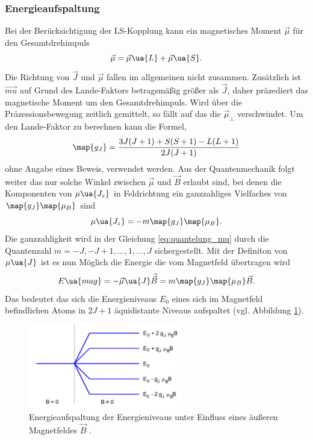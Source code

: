 \subsubsection{Energieaufspaltung}
Bei der Berücksichtigung der LS-Kopplung kann ein magnetisches Moment $\vec{\mu}$ für den Gesamtdrehimpuls
\begin{equation*}
  \vec{\mu}=\vec{\mu}\ua{L} + \vec{\mu}\ua{S}.
\end{equation*}
Die Richtung von $\vec{J}$ und $\vec{\mu}$ fallen im allgemeinen nicht zusammen. Zusätzlich ist
$\vec{mu}$ auf Grund des Lande-Faktors betragsmäßig größer als $\vec{J}$, daher präzediert das magnetische Moment um den Gesamtdrehimpuls.
Wird über die Präzessionsbewegung zeitlich gemittelt, so fällt auf das die $\vec{\mu}_{\perp}$ verschwindet.
Um den Lande-Faktor zu berechnen kann die Formel,
\begin{equation}
  \label{eq:lande_faktor}
  \map{g_J}=\frac{3J(J+1)+S(S+1)-L(L+1)}{2J(J+1)}
\end{equation}
ohne Angabe eines Beweis, verwendet werden.
Aus der Quantenmechanik folgt weiter das nur solche Winkel zwischen $\vec{\mu}$ und
$\vec{B}$ erlaubt sind, bei denen die Komponenten von $\mu\ua{J_z}$ in Feldrichtung ein ganzzahliges Vielfaches von
$\map{g_J}\map{\mu_B}$ sind
\begin{equation}
  \label{eq:quantelung_mu}
  \mu\ua{J_z}=-m\map{g_J}\map{\mu_B}.
\end{equation}
Die ganzzahligkeit wird in der Gleichung \eqref{eq:quantelung_mu} durch die Quantenzahl
$m=-J,-J+1,\dots,1,\dots, J$ sichergestellt.
Mit der Definiton von $\mu\ua{J}$ ist es nun Möglich die Energie die vom Magnetfeld
übertragen wird
\begin{equation}
  \label{eq:energie_mag}
  E\ua{mag}=-\vec{\mu}\ua{J}\vec{\vec{B}}=m\map{g_J}\map{\mu_B}\vec{B}.
\end{equation}
Das bedeutet das sich die Energieniveaus $E_0$ eines sich im Magnetfeld befindlichen Atoms
in $2J+1$ äquidistante Niveaus aufspaltet (vgl. Abbildung \ref{fig: energie_magnet}).
\FloatBarrier
\begin{figure}[h]
  \centering
  \includegraphics[width=0.6\textwidth]{pics/energieaufspaltung_magnetfeld.png}
  \caption{Energieaufspaltung der Energieniveaus unter Einfluss eines äußeren Magnetfeldes $\vec{B}$ \cite{anleitung27}.}
  \label{fig: energie_magnet}
\end{figure}
\FloatBarrier

